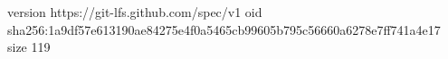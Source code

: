 version https://git-lfs.github.com/spec/v1
oid sha256:1a9df57e613190ae84275e4f0a5465cb99605b795c56660a6278e7ff741a4e17
size 119
